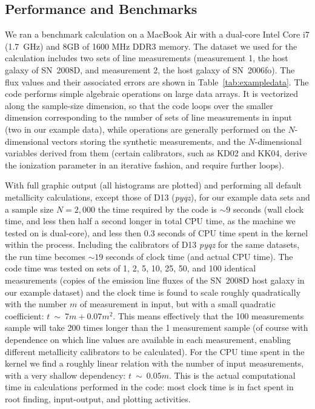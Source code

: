 \documentclass{emulateapj} \usepackage{amsmath} \usepackage{float}
\begin{document}
\subsection{Performance and Benchmarks}
We ran a benchmark calculation on a MacBook Air with a dual-core Intel
Core i7 (1.7~GHz) and 8GB of 1600 MHz DDR3 memory. The dataset we used
for the calculation includes two sets of line measurements
(measurement 1, the host galaxy of SN~2008D, and measurement 2, the
host galaxy of SN~2006fo). The flux values and their associated errors
are shown in Table~\ref{tab:exampledata}. The code performs simple
algebraic operations on large data arrays. It is vectorized along the
sample-size dimension, so that the code loops over the smaller
dimension corresponding to the number of sets of line measurements in
input (two in our example data), while operations are generally
performed on the $N$-dimensional vectors storing the synthetic
measurements, and the $N$-dimensional variables derived from them
(certain calibrators, such as KD02 and KK04, derive the ionization
parameter in an iterative fashion, and require further loops).


With full graphic output (all histograms are plotted) and performing
all default metallicity calculations, except those of D13
(\emph{pyqz}), for our example data sets and a sample size $N=2,000$
the time required by the code is $\sim9$ seconds (wall clock time, and
less then half a second longer in total CPU time, as the machine we
tested on is dual-core), and less then 0.3 seconds of CPU time spent
in the kernel within the process. Including the calibrators of D13
\emph{pyqz} for the same datasets, the run time becomes $\sim19$
seconds of clock time (and actual CPU time).  The code time was tested
on sets of 1, 2, 5, 10, 25, 50, and 100 identical measurements (copies
of the emission line fluxes of the SN~2008D host galaxy in our example
dataset) and the clock time is found to scale roughly
quadratically with the number $m$ of measurement in input, but with a
small quadratic coefficient: $t~\sim~7m+0.07m^2$. This means
effectively that the 100 measurements sample will take 200 times
longer than the 1 measurement sample (of course with dependence on
which line values are available in each measurement, enabling
different metallicity calibrators to be calculated). For the CPU time
spent in the kernel we find a roughly linear relation with the number
of input measurements, with a very shallow dependency: $t~\sim~
0.05m$. This is the actual computational time in calculations
performed in the code: most clock time is in fact spent in root
finding, input-output, and plotting activities.
\end{document}
